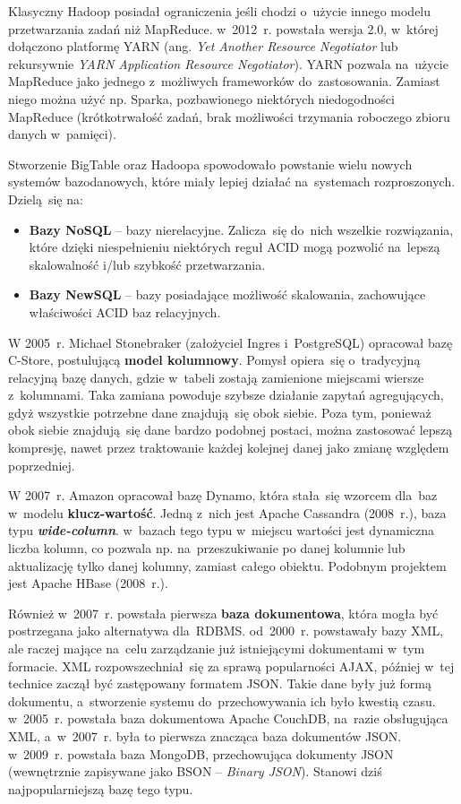 \documentclass[12pt,a4paper,twoside,titlepage,openright]{book}
\begin{document}
Klasyczny Hadoop posiadał ograniczenia jeśli chodzi o~użycie innego modelu przetwarzania zadań niż MapReduce. w~2012~r. powstała wersja 2.0, w~której dołączono platformę YARN (ang. \textit{Yet Another Resource Negotiator} lub rekursywnie \textit{YARN Application Resource Negotiator}). YARN pozwala na~użycie MapReduce jako jednego z~możliwych frameworków do~zastosowania. Zamiast niego można użyć np. Sparka, pozbawionego niektórych niedogodności MapReduce (krótkotrwałość zadań, brak możliwości trzymania roboczego zbioru danych w~pamięci). \cite{hadoop, bigData}

Stworzenie BigTable oraz Hadoopa spowodowało powstanie wielu nowych systemów bazodanowych, które miały lepiej działać na~systemach rozproszonych. Dzielą~się na:
\begin{itemize}
\item \textbf{Bazy NoSQL} -- bazy nierelacyjne. Zalicza~się do~nich wszelkie rozwiązania, które dzięki niespełnieniu niektórych reguł ACID mogą pozwolić na~lepszą skalowalność i/lub szybkość przetwarzania.
\item \textbf{Bazy NewSQL} -- bazy posiadające możliwość skalowania, zachowujące właściwości ACID baz relacyjnych.
\end{itemize}

W 2005~r. Michael Stonebraker (założyciel Ingres i~PostgreSQL) opracował bazę C-Store, postulującą \textbf{model kolumnowy}. Pomysł opiera~się o~tradycyjną relacyjną bazę danych, gdzie w~tabeli zostają zamienione miejscami wiersze z~kolumnami. Taka zamiana powoduje szybsze działanie zapytań agregujących, gdyż wszystkie potrzebne dane znajdują~się obok siebie. Poza tym, ponieważ obok siebie znajdują~się dane bardzo podobnej postaci, można zastosować lepszą kompresję, nawet przez traktowanie każdej kolejnej danej jako zmianę względem poprzedniej.

W 2007~r. Amazon opracował bazę Dynamo, która stała~się wzorcem dla~baz w~modelu \textbf{klucz-wartość}. Jedną z~nich jest Apache Cassandra (2008~r.), baza typu \textit{\textbf{wide-column}}. w~bazach tego typu w~miejscu wartości jest dynamiczna liczba kolumn, co pozwala np. na~przeszukiwanie po danej kolumnie lub aktualizację tylko danej kolumny, zamiast całego obiektu. Podobnym projektem jest Apache HBase (2008~r.).

Również w~2007~r. powstała pierwsza \textbf{baza dokumentowa}, która mogła być postrzegana jako alternatywa dla~RDBMS. od~2000~r. powstawały bazy XML, ale raczej mające na~celu zarządzanie już istniejącymi dokumentami w~tym formacie. XML rozpowszechniał~się za sprawą popularności AJAX, później w~tej technice zaczął być zastępowany formatem JSON. Takie dane były już formą dokumentu, a~stworzenie systemu do~przechowywania ich było kwestią czasu. w~2005~r. powstała baza dokumentowa Apache CouchDB, na~razie obsługująca XML, a~w~2007~r. była to pierwsza znacząca baza dokumentów JSON. w~2009~r. powstała baza MongoDB, przechowująca dokumenty JSON (wewnętrznie zapisywane jako BSON -- \textit{Binary JSON}). Stanowi dziś najpopularniejszą bazę tego typu.
\end{document}
